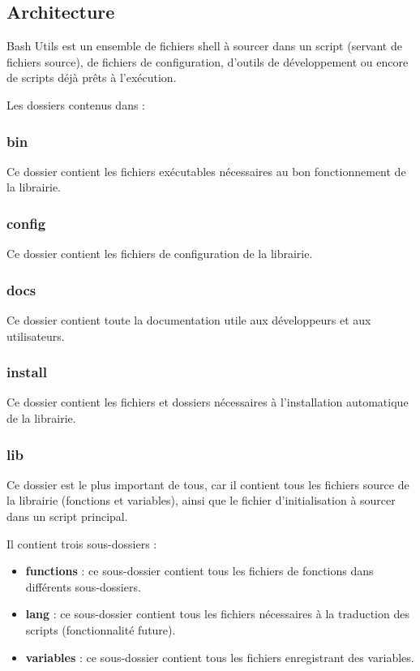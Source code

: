 \documentclass[a4paper,10pt]{article}
\begin{document}
\color{green}
\subsection{Architecture}\color{white}
Bash Utils est un ensemble de fichiers shell à sourcer dans un script (servant de fichiers source), de fichiers de configuration, d'outils de développement ou encore de scripts déjà prêts à l'exécution.

Les dossiers contenus dans  :
\color{blue}
\subsubsection{bin}\color{white}
Ce dossier contient les fichiers exécutables nécessaires au bon fonctionnement de la librairie.

\color{blue}
\subsubsection{config}\color{white}
Ce dossier contient les fichiers de configuration de la librairie.

\color{blue}
\subsubsection{docs}\color{white}
Ce dossier contient toute la documentation utile aux développeurs et aux utilisateurs.

\color{blue}
\subsubsection{install}\color{white}
Ce dossier contient les fichiers et dossiers nécessaires à l'installation automatique de la librairie.

\color{blue}
\subsubsection{lib}\color{white}
Ce dossier est le plus important de tous, car il contient tous les fichiers source de la librairie (fonctions et variables), ainsi que le fichier d'initialisation à sourcer dans un script principal.

Il contient trois sous-dossiers :
\begin{itemize}
    \item \color{lime}\textbf{functions}\color{white} : ce sous-dossier contient tous les fichiers de fonctions dans différents sous-dossiers.
    \item \color{lime}\textbf{lang}\color{white} : ce sous-dossier contient tous les fichiers nécessaires à la traduction des scripts (fonctionnalité future).
    \item \color{lime}\textbf{variables}\color{white} : ce sous-dossier contient tous les fichiers enregistrant des variables.
\end{itemize}
\end{document}
